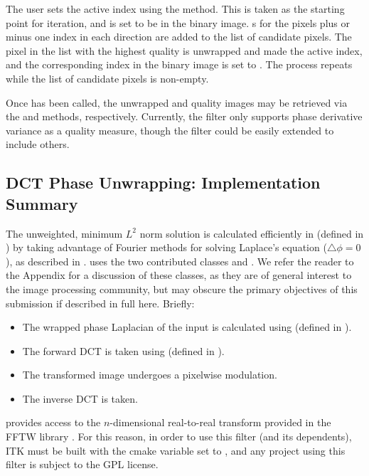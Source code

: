 The user sets the active index using the  method.  This is taken as the starting point for iteration, and is set to be  in the binary image.  s for the pixels plus or minus one index in each direction are added to the list of candidate pixels.  The pixel in the list with the highest quality is unwrapped and made the active index, and the corresponding index in the binary image is set to .  The process repeats while the list of candidate pixels is non-empty.

Once  has been called, the unwrapped and quality images may be retrieved via the  and  methods, respectively.  Currently, the filter only supports phase derivative variance as a quality measure, though the filter could be easily extended to include others.

\subsection{DCT Phase Unwrapping: Implementation Summary}

The unweighted, minimum $L^2$ norm solution is calculated efficiently in  (defined in ) by taking advantage of Fourier methods for solving Laplace's equation ($\bigtriangleup \phi = 0$), as described in \cite{Ghiglia1998}.   uses the two contributed classes  and .  We refer the reader to the Appendix for a discussion of these classes, as they are of general interest to the image processing community, but may obscure the primary objectives of this submission if described in full here.  Briefly:

\begin{itemize}

\item The wrapped phase Laplacian of the input is calculated using  (defined in ).
\item The forward DCT is taken using  (defined in ).
\item The  transformed image undergoes a pixelwise modulation.
\item The inverse DCT is taken.

\end{itemize}

 provides access to the $n$-dimensional real-to-real transform provided in the FFTW library \cite{Frigo2005}.  For this reason, in order to use this filter (and its dependents), ITK must be built with the cmake variable  set to , and any project using this filter is subject to the GPL license.
